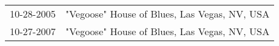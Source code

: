 \begin{supertabular}{ll}
 10-28-2005 &  "Vegoose" House of Blues, Las Vegas, NV, USA \\
 10-27-2007 &  "Vegoose" House of Blues, Las Vegas, NV, USA \\
\end{supertabular}
